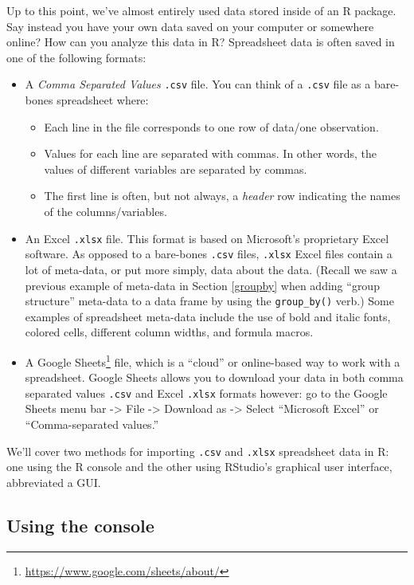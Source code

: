 \documentclass[12pt, krantz2,]{krantz}
\providecommand{\tightlist}{%
  \setlength{\itemsep}{0pt}\setlength{\parskip}{0pt}}
\renewcommand{\href}[2]{#2\footnote{\url{#1}}}
\begin{document}
Up to this point, we've almost entirely used data stored inside of an R package. Say instead you have your own data saved on your computer or somewhere online? How can you analyze this data in R? Spreadsheet data is often saved in one of the following formats:

\begin{itemize}
\tightlist
\item
  A \emph{Comma Separated Values} \texttt{.csv} file. You can think of a \texttt{.csv} file as a bare-bones spreadsheet where:

  \begin{itemize}
  \tightlist
  \item
    Each line in the file corresponds to one row of data/one observation.
  \item
    Values for each line are separated with commas. In other words, the values of different variables are separated by commas.
  \item
    The first line is often, but not always, a \emph{header} row indicating the names of the columns/variables.
  \end{itemize}
\item
  An Excel \texttt{.xlsx} file. This format is based on Microsoft's proprietary Excel software. As opposed to a bare-bones \texttt{.csv} files, \texttt{.xlsx} Excel files contain a lot of meta-data, or put more simply, data about the data. (Recall we saw a previous example of meta-data in Section \ref{groupby} when adding ``group structure'' meta-data to a data frame by using the \texttt{group\_by()} verb.) Some examples of spreadsheet meta-data include the use of bold and italic fonts, colored cells, different column widths, and formula macros.
\item
  A \href{https://www.google.com/sheets/about/}{Google Sheets} file, which is a ``cloud'' or online-based way to work with a spreadsheet. Google Sheets allows you to download your data in both comma separated values \texttt{.csv} and Excel \texttt{.xlsx} formats however: go to the Google Sheets menu bar -\textgreater{} File -\textgreater{} Download as -\textgreater{} Select ``Microsoft Excel'' or ``Comma-separated values.''
\end{itemize}

We'll cover two methods for importing \texttt{.csv} and \texttt{.xlsx} spreadsheet data in R: one using the R console and the other using RStudio's graphical user interface, abbreviated a GUI.

\hypertarget{using-the-console}{%
\subsection{Using the console}\label{using-the-console}}
\end{document}

